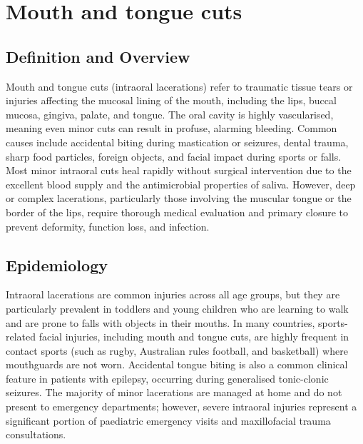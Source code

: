 \chapter{Mouth and tongue cuts}

\section*{Definition and Overview}
Mouth and tongue cuts (intraoral lacerations) refer to traumatic tissue tears or injuries affecting the mucosal lining of the mouth, including the lips, buccal mucosa, gingiva, palate, and tongue. The oral cavity is highly vascularised, meaning even minor cuts can result in profuse, alarming bleeding. Common causes include accidental biting during mastication or seizures, dental trauma, sharp food particles, foreign objects, and facial impact during sports or falls. Most minor intraoral cuts heal rapidly without surgical intervention due to the excellent blood supply and the antimicrobial properties of saliva. However, deep or complex lacerations, particularly those involving the muscular tongue or the border of the lips, require thorough medical evaluation and primary closure to prevent deformity, function loss, and infection.

\section*{Epidemiology}
Intraoral lacerations are common injuries across all age groups, but they are particularly prevalent in toddlers and young children who are learning to walk and are prone to falls with objects in their mouths. In many countries, sports-related facial injuries, including mouth and tongue cuts, are highly frequent in contact sports (such as rugby, Australian rules football, and basketball) where mouthguards are not worn. Accidental tongue biting is also a common clinical feature in patients with epilepsy, occurring during generalised tonic-clonic seizures. The majority of minor lacerations are managed at home and do not present to emergency departments; however, severe intraoral injuries represent a significant portion of paediatric emergency visits and maxillofacial trauma consultations.

